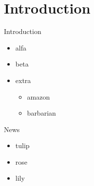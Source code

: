\section{Introduction}

\begin{frame}{Introduction}
  \begin{itemize}
    \item alfa
    \item beta
    \item extra
      \begin{itemize}
        \item amazon
        \item barbarian
      \end{itemize}
  \end{itemize}
\end{frame}

\begin{frame}{News}
  \begin{itemize}
    \item tulip
    \item rose
    \item lily
  \end{itemize}
\end{frame}

